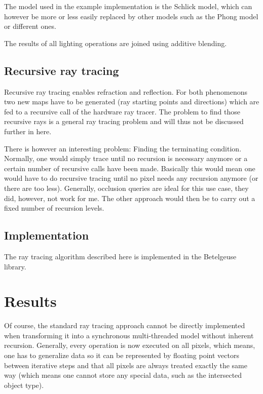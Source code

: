 \documentclass[english,fleqn,10pt,twocolumn]{article}
\begin{document}
The model used in the example implementation is the Schlick model\cite{SCHL93}, which can however be more or less easily replaced by other models such as the Phong model or different ones.

The results of all lighting operations are joined using additive blending.

\subsection{Recursive ray tracing}

Recursive ray tracing enables refraction and reflection. For both phenomenons two new maps have to be generated (ray starting points and directions) which are fed to a recursive call of the hardware ray tracer. The problem to find those
recursive rays is a general ray tracing problem and will thus not be discussed further in here.

There is however an interesting problem: Finding the terminating condition. Normally, one would simply trace until no recursion is necessary anymore or a certain number of recursive calls have been made. Basically this would mean
one would have to do recursive tracing until no pixel needs any recursion anymore (or there are too less). Generally, occlusion queries are ideal for this use case, they did, however, not work for me. The other approach would then be to
carry out a fixed number of recursion levels.

\subsection{Implementation}

The ray tracing algorithm described here is implemented in the Betelgeuse library.


\section{Results}

Of course, the standard ray tracing approach cannot be directly implemented when transforming it into a synchronous multi-threaded model without inherent recursion. Generally, every operation is now executed on all pixels, which means,
one has to generalize data so it can be represented by floating point vectors between iterative steps and that all pixels are always treated exactly the same way (which means one cannot store any special data, such as the intersected
object type).
\end{document}
